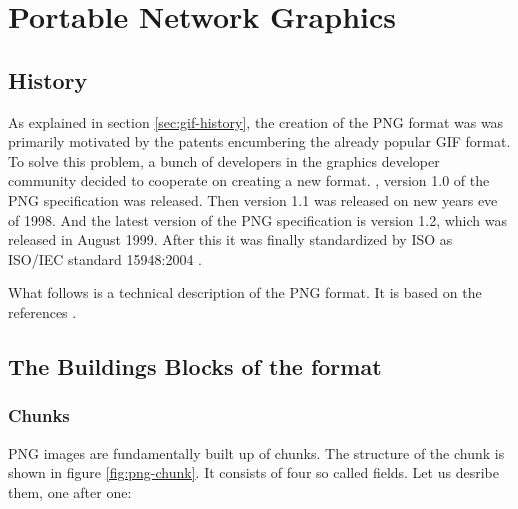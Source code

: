 \begin{comment}
  
\end{comment}


\chapter{Portable Network Graphics}
\label{cha:png}

\newcommand{\chnk}[1]{``#1''}

\newcommand{\IDAT}{\chnk{IDAT}\xspace}

\section{History}

As explained in section \ref{sec:gif-history}, the creation of the PNG
format was was primarily motivated by the patents encumbering the
already popular GIF format. To solve this problem, a bunch of
developers in the graphics developer community decided to cooperate on
creating a new format. , version 1.0 of the PNG
specification was released. Then version 1.1 was released on new years
eve of 1998. And the latest version of the PNG specification is
version 1.2, which was released in August 1999. After this it was
finally standardized by ISO as ISO/IEC standard 15948:2004
\cite{roelofs09:_histor_portab_networ_graph_png_format,roelofs99:_png,roelofs:_portab_networ_graph_main}.

What follows is a technical description of the PNG format. It is based
on the references
\cite{boutel:_png_portab_networ_graph_specif_version12,roelofs99:_png,boutel:_png_portab_networ_graph_specif_version11}.

  \cite{sivonen:_sad_story_png_gamma_correc}

\section{The Buildings Blocks of the format}

\subsection{Chunks}

PNG images are fundamentally built up of chunks. The structure of the
chunk is shown in figure \ref{fig:png-chunk}. It consists of four so
called fields. Let us desribe them, one after one:

